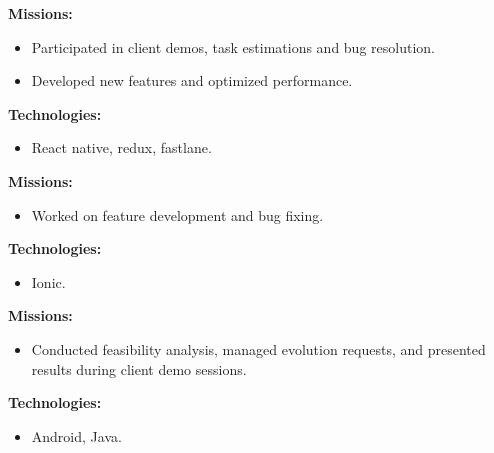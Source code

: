 \documentclass[10pt,a4paper,withhyper]{altacv}
\begin{document}
\begin{paracol}{2}
\divider


\textbf{Missions:}

\begin{itemize}
\addtolength{\itemindent}{0.1cm}
\item Participated in client demos, task estimations and bug resolution.
\item Developed new features and optimized performance.

\end{itemize}

\textbf{Technologies:}

\begin{itemize}
	\addtolength{\itemindent}{0.1cm}
	\item React native, redux, fastlane.
	
\end{itemize}
\divider

\textbf{Missions:}

\begin{itemize}
	\addtolength{\itemindent}{0.1cm}
	\item Worked on feature development and bug fixing.
\end{itemize}

\textbf{Technologies:}	
\begin{itemize}
	\addtolength{\itemindent}{0.1cm}
	\item Ionic.
	
\end{itemize}
\divider


\textbf{Missions:}

\begin{itemize}
	\addtolength{\itemindent}{0.1cm}
	\item Conducted feasibility analysis, managed evolution requests, and presented results during client demo sessions.
\end{itemize}

	\textbf{Technologies:}	
\begin{itemize}
	\addtolength{\itemindent}{0.1cm}
	\item Android, Java.
	
\end{itemize}


\end{paracol}
\end{document}
